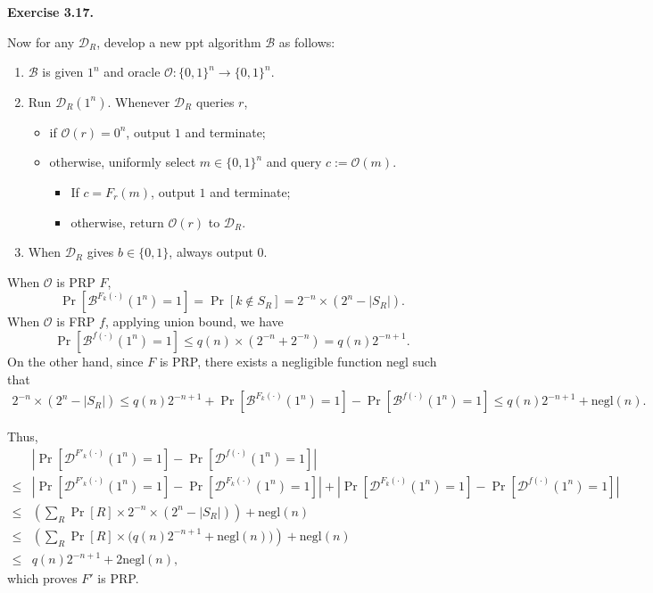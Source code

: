 \documentclass[a4paper]{article}
\newenvironment{exercise}[1]{
	\par
	\noindent\textbf{Exercise #1.}\quad
}{
	\par
	\bigskip
}
\newcommand{\abs}[1]{\left| #1 \right|}
\newcommand{\pbra}[1]{\left( #1 \right)}
\newcommand{\sbra}[1]{\left[ #1 \right]}
\newcommand{\bin}{\{0,1\}}
\newcommand{\negl}{\mathrm{negl}}
\newcommand{\ppt}{{\sc ppt} }
\begin{document}
\begin{exercise}{3.17}
    Now for any $\mathcal D_R$, develop a new \ppt algorithm $\mathcal B$ as follows:
    \begin{enumerate}
        \item $\mathcal B$ is given $1^n$ and oracle $\mathcal O:\bin^n\to\bin^n$.
        \item Run $\mathcal D_R(1^n)$. Whenever $\mathcal D_R$ queries $r$,
            \begin{itemize}
                \item if $\mathcal O(r)=0^n$, output $1$ and terminate;
                \item otherwise, uniformly select $m\in\bin^n$ and query $c:=\mathcal O(m)$.
                    \begin{itemize}
                        \item If $c=F_r(m)$, output $1$ and terminate;
                        \item otherwise, return $\mathcal O(r)$ to $\mathcal D_R$.
                    \end{itemize}
            \end{itemize}
        \item When $\mathcal D_R$ gives $b\in\bin$, always output $0$.
    \end{enumerate}
    When $\mathcal O$ is PRP $F$,
    $$
    \Pr\sbra{\mathcal B^{F_k(\cdot)}(1^n)=1}=\Pr\sbra{k\notin S_R}
    =2^{-n}\times\pbra{2^n-\abs{S_R}}.
    $$
    When $\mathcal O$ is FRP $f$, applying union bound, we have
    $$
    \Pr\sbra{\mathcal B^{f(\cdot)}(1^n)=1}\leq q(n)\times\pbra{2^{-n}+2^{-n}}=q(n)2^{-n+1}.
    $$
    On the other hand, since $F$ is PRP, there exists a negligible function $\negl$ such that
    \begin{align*}
        2^{-n}\times\pbra{2^n-\abs{S_R}}\leq
        q(n)2^{-n+1}+\Pr\sbra{\mathcal B^{F_k(\cdot)}(1^n)=1}-\Pr\sbra{\mathcal B^{f(\cdot)}(1^n)=1}
        \leq q(n)2^{-n+1}+\negl(n).
    \end{align*}

    Thus,
    \begin{align*}
        &\abs{\Pr\sbra{\mathcal D^{F'_k(\cdot)}(1^n)=1}-\Pr\sbra{\mathcal D^{f(\cdot)}(1^n)=1}}\\
        \leq
        &\abs{\Pr\sbra{\mathcal D^{F'_k(\cdot)}(1^n)=1}-\Pr\sbra{\mathcal D^{F_k(\cdot)}(1^n)=1}}
        +\abs{\Pr\sbra{\mathcal D^{F_k(\cdot)}(1^n)=1}-\Pr\sbra{\mathcal D^{f(\cdot)}(1^n)=1}}\\
        \leq&\pbra{\sum_R\Pr\sbra{R}\times 2^{-n}\times\pbra{2^n-\abs{S_R}}}+\negl(n)\\
        \leq&\pbra{\sum_R\Pr\sbra{R}\times\Big(q(n)2^{-n+1}+\negl(n)\Big)}+\negl(n)\\
        \leq&q(n)2^{-n+1}+2\negl(n),
    \end{align*}
    which proves $F'$ is PRP.
\end{exercise}
\end{document}
